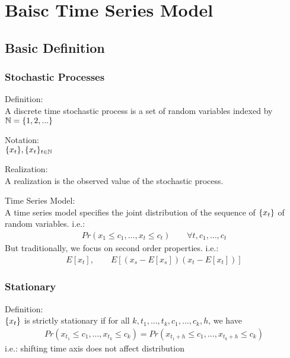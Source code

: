 \chapter{Baisc Time Series Model} 

\section{Basic Definition}
\subsection{Stochastic Processes}
Definition: \\
A discrete time stochastic process is a set of random variables indexed by $\mathbb{N} = \{ 1,2,... \}$ \\ \par

Notation: \\
$\{ x_t \}, \{ x_t \}_{t\in \mathbb{N}}$\\
\par

Realization: \\
A realization is the observed value of the stochastic process. \\
\par

Time Series Model: \\
A time series model specifies the joint distribution of the sequence of $\{ x_t \}$ of random variables. i.e.: \begin{align*}
    Pr(x_1 \leq c_1, ..., x_t \leq c_t) \qquad \forall t, c_1, ..., c_t
\end{align*}
But traditionally, we focus on second order properties. i.e.: 
\begin{align*}
    E[x_t], \qquad E\left [(x_s - E[x_s])(x_t - E[x_t])\right]
\end{align*}


\subsection{Stationary}
Definition: \\
$\{ x_t \}$ is strictly stationary if for all $k, t_1, ..., t_k, c_1, ..., c_k, h$, we have 
    \begin{align*}
        Pr(x_{t_1} \leq c_1, ..., x_{t_k} \leq c_k) =  Pr(x_{t_1 + h} \leq c_1, ..., x_{t_k + h} \leq c_k)
    \end{align*}
i.e.: shifting time axis does not affect distribution \\ 
\par

